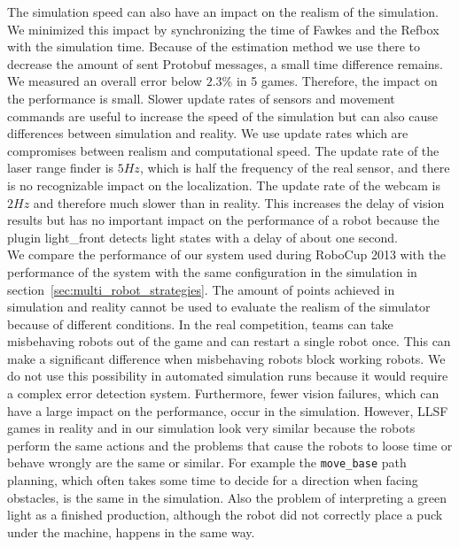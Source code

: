The simulation speed can also have an impact on the realism of the simulation. We minimized this impact by synchronizing the time of Fawkes and the Refbox with the simulation time. Because of the estimation method we use there to decrease the amount of sent Protobuf messages, a small time difference remains. We measured an overall error below $2.3\%$ in 5 games. Therefore, the impact on the performance is small.
Slower update rates of sensors and movement commands are useful to increase the speed of the simulation but can also cause differences between simulation and reality. We use update rates which are compromises between realism and computational speed. The update rate of the laser range finder is $5 Hz$, which is half the frequency of the real sensor, and there is no recognizable impact on the localization. The update rate of the webcam is $2 Hz$ and therefore much slower than in reality. This increases the delay of vision results but has no important impact on the performance of a robot because the plugin light\_front detects light states with a delay of about one second.\\
We compare the performance of our system used during RoboCup 2013 with the performance of the system with the same configuration in the simulation in section~\ref{sec:multi_robot_strategies}. The amount of points achieved in simulation and reality cannot be used to evaluate the realism of the simulator because of different conditions. In the real competition, teams can take misbehaving robots out of the game and can restart a single robot once. This can make a significant difference when misbehaving robots block working robots. We do not use this possibility in automated simulation runs because it would require a complex error detection system. Furthermore, fewer vision failures, which can have a large impact on the performance, occur in the simulation. However, LLSF games in reality and in our simulation look very similar because the robots perform the same actions and the problems that cause the robots to loose time or behave wrongly are the same or similar. For example the \texttt{move\_base} path planning, which often takes some time to decide for a direction when facing obstacles, is the same in the simulation. Also the problem of interpreting a green light as a finished production, although the robot did not correctly place a puck under the machine, happens in the same way.

